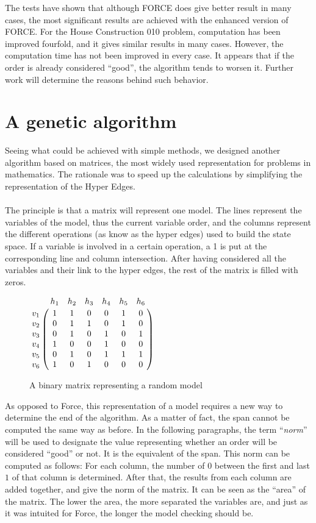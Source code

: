 \documentclass[12pt]{report}
\begin{document}
The tests have shown that although FORCE does give better result in many cases, the most significant results are achieved with the enhanced version of FORCE. For the House Construction 010 problem, computation has been improved fourfold, and it gives similar results in many cases. However, the computation time has not been improved in every case. It appears that if the order is already considered \enquote{good}, the algorithm tends to worsen it. Further work will determine the reasons behind such behavior.

\chapter{A genetic algorithm}

Seeing what could be achieved with simple methods, we designed another algorithm based on matrices, the most widely used representation for problems in mathematics. The rationale was to speed up the calculations by simplifying the representation of the Hyper Edges.
\\\\
The principle is that a matrix will represent one model. The lines represent the variables of the model, thus the current variable order, and the columns represent the different operations (as know as the hyper edges) used to build the state space. If a variable is involved in a certain operation, a 1 is put at the corresponding line and column intersection. After having considered all the variables and their link to the hyper edges, the rest of the matrix is filled with zeros.

\begin{figure}[!h]
  \centering
  $\bordermatrix{
  ~ & h_1 & h_2 & h_3 & h_4 & h_5 & h_6 \cr
  v_1 & 1 & 1 & 0 & 0 & 1 & 0 \cr
  v_2 & 0 & 1 & 1 & 0 & 1 & 0 \cr
  v_3 & 0 & 1 & 0 & 1 & 0 & 1 \cr
  v_4 & 1 & 0 & 0 & 1 & 0 & 0 \cr
  v_5 & 0 & 1 & 0 & 1 & 1 & 1 \cr
  v_6 & 1 & 0 & 1 & 0 & 0 & 0\cr
  }$
  \caption{A binary matrix representing a random model}
  \label{example_matrix}
\end{figure}

As opposed to Force, this representation of a model requires a new way to determine the end of the algorithm. As a matter of fact, the span cannot be computed the same way as before. In the following paragraphs, the term \enquote{\it{norm}} will be used to designate the value representing whether an order will be considered \enquote{good} or not. It is the equivalent of the span. This norm can be computed as follows:
For each column, the number of 0 between the first and last $1$ of that column is determined. After that, the results from each column are added together, and give the norm of the matrix. It can be seen as the \enquote{area} of the matrix. The lower the area, the more separated the variables are, and just as it was intuited for Force, the longer the model checking should be.
\end{document}
